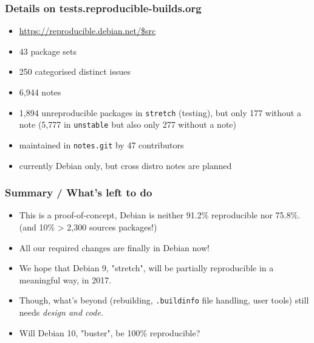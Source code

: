 \documentclass[14pt]{beamer}
\begin{document}
\begin{frame}
 \frametitle{Details on tests.reproducible-builds.org}

 \begin{itemize}
  \item \url{https://reproducible.debian.net/$src}
  \item 43 package sets 
  \item 250 categorised distinct issues
  \item 6,944 notes
  \item 1,894 unreproducible packages in \texttt{stretch} (testing), but only
  177 without a note (5,777 in \texttt{unstable} but also only 277 without a
  note)
  \item maintained in \texttt{notes.git} by 47 contributors
  \item currently Debian only, but cross distro notes are planned
 \end{itemize}
\end{frame}


\begin{frame}
 \frametitle{Summary / What's left to do}
 \begin{itemize}
  \item This is a proof-of-concept, Debian is neither 91.2\% reproducible nor
  75.8\%. (and 10\% > 2,300 sources packages!)
  \item<2-4> All our required changes are finally in Debian now!
  \item<3-4> We hope that Debian 9, "stretch", will be partially reproducible
  in a meaningful way, in 2017.
  \item<3-4> Though, what's beyond (rebuilding, \texttt{.buildinfo} file handling, user
  tools) still needs \it{design} and code.
  \item<4> Will Debian 10, "buster", be 100\% reproducible?
 \end{itemize}
\end{frame}
\end{document}
